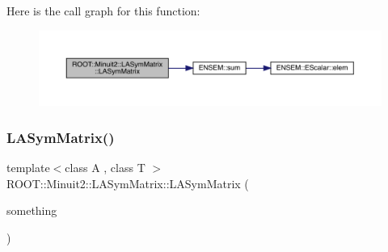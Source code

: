 Here is the call graph for this function\+:
\nopagebreak
\begin{figure}[H]
\begin{center}
\leavevmode
\includegraphics[width=350pt]{d3/d72/classROOT_1_1Minuit2_1_1LASymMatrix_a252615373ae5ffe035baa9e8221e67e3_cgraph}
\end{center}
\end{figure}
\mbox{\label{classROOT_1_1Minuit2_1_1LASymMatrix_ac807736f91c64875cb01e13050a6c925}} 
\subsubsection{\texorpdfstring{LASymMatrix()}{LASymMatrix()}\hspace{0.1cm}{\footnotesize\ttfamily [6/30]}}
{\footnotesize\ttfamily template$<$class A , class T $>$ \\
R\+O\+O\+T\+::\+Minuit2\+::\+L\+A\+Sym\+Matrix\+::\+L\+A\+Sym\+Matrix (\begin{DoxyParamCaption}\item[{const \mbox{\hyperlink{classROOT_1_1Minuit2_1_1ABObj}{A\+B\+Obj}}$<$ \mbox{\hyperlink{classROOT_1_1Minuit2_1_1sym}{sym}}, \mbox{\hyperlink{classROOT_1_1Minuit2_1_1ABObj}{A\+B\+Obj}}$<$ \mbox{\hyperlink{classROOT_1_1Minuit2_1_1sym}{sym}}, A, T $>$, T $>$ \&}]{something }\end{DoxyParamCaption})\hspace{0.3cm}{\ttfamily [inline]}}

\mbox{\label{classROOT_1_1Minuit2_1_1LASymMatrix_a0089b4055d0d08767d7072657b6f87d5}} 
